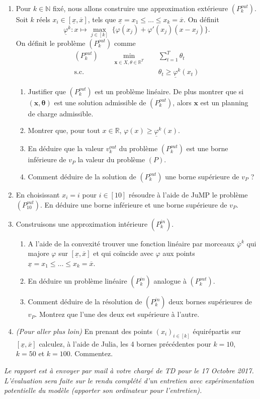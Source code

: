 \documentclass[10pt]{article}
\def\x{\mathbf{x}}
\def\R{\mathbb{R}}
\def\btheta{\boldsymbol{\theta}}
\begin{document}
\begin{enumerate}[resume]
	\item Pour $k\in\mathbb{N}$ fixé, nous allons construire une approximation extérieure $(P^{out}_k)$. Soit $k$ réels $x_i\in [\underline{x},\overline{x}]$, tels que $\underline{x} = x_1 \leq \dots \leq x_k = \overline{x}$. On définit
		$$ \underline{\varphi}^k : x \mapsto \max_{j\in[k]} \; \{\varphi(x_j) + \varphi'(x_j)(x-x_j)\}.$$
		On définit le problème $(P^{out}_k)$ comme
		\begin{align*}
		(P^{out}_k) \qquad \min_{\x \in X, \theta \in \R^T} \quad & \sum_{t=1}^T \theta_t \\
		\mbox{s.c.} \quad & \theta_t \geq \underline{\varphi}^k(x_t)
		\end{align*}
	\begin{enumerate}
		\item Justifier que $(P^{out}_k)$ est un problème linéaire. De plus montrer que si $(\x, \btheta)$ est une solution admissible de $(P^{out}_k)$, alors $\x$ est un planning de charge admissible.
		\item Montrer que, pour tout $x \in \R$, $\varphi(x) \geq \underline{\varphi}^k(x)$.
		\item En déduire que la valeur $v^{out}_k$ du problème $(P^{out}_k)$ est une borne inférieure de $v_P$ la valeur du problème $(P)$.
		\item Comment déduire de la solution de $(P^{out}_k)$ une borne supérieure de $v_P$ ?
	\end{enumerate}
	\item En choisissant $x_i = i$ pour $i\in [10]$ résoudre à l'aide de JuMP le problème $(P^{out}_{10})$. En déduire une borne inférieure et une borne supérieure de $v_P$.
	\item Construisons une approximation intérieure $(P^{in}_k)$.
	\begin{enumerate}
		\item A l'aide de la convexité trouver une fonction linéaire par morceaux $\overline{\varphi}^k$ qui majore $\varphi$ sur $[\underline{x},\overline{x}]$ et qui coïncide avec $\varphi$ aux points $\underline{x} = x_1 \leq \dots \leq x_k = \overline{x}$.
		\item En déduire un problème linéaire $(P^{in}_k)$ analogue à $(P^{out}_k)$.
		\item Comment déduire de la résolution de $(P^{in}_k)$ deux bornes supérieures de $v_P$. Montrez que l'une des deux est supérieure à l'autre.
	\end{enumerate}
	\item {\em (Pour aller plus loin)} En prenant des points $(x_i)_{i\in[k]}$ équirépartis sur $[\underline{x},\overline{x}]$ calculez, à l'aide de Julia, les 4 bornes précédentes pour $k=10$, $k=50$ et $k=100$. Commentez.
\end{enumerate}


{\em Le rapport est à envoyer par mail à votre chargé de TD pour le 17
Octobre 2017. L'évaluation sera faite sur le rendu complété d'un entretien
avec expérimentation potentielle du modèle (apporter son ordinateur pour
l'entretien).}
\end{document}
